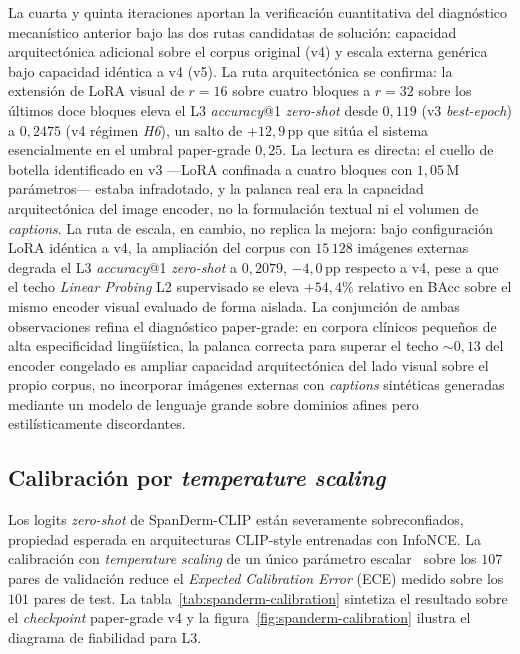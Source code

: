 La cuarta y quinta iteraciones aportan la verificación cuantitativa
del diagnóstico mecanístico anterior bajo las dos rutas
candidatas de solución: capacidad arquitectónica adicional sobre
el corpus original (v4) y escala externa genérica bajo capacidad
idéntica a v4 (v5). La ruta arquitectónica se confirma: la
extensión de LoRA visual de $r=16$ sobre cuatro bloques a $r=32$
sobre los últimos doce bloques eleva el L3 \emph{accuracy}@1
\emph{zero-shot} desde $0{,}119$ (v3 \emph{best-epoch}) a
$0{,}2475$ (v4 régimen \emph{H6}), un salto de $+12{,}9$\,pp que
sitúa el sistema esencialmente en el umbral paper-grade
$0{,}25$. La lectura es directa: el cuello de botella
identificado en v3 ---LoRA confinada a cuatro bloques con
$1{,}05$\,M parámetros--- estaba infradotado, y la palanca real
era la capacidad arquitectónica del image encoder, no la
formulación textual ni el volumen de \emph{captions}. La ruta de
escala, en cambio, no replica la mejora: bajo configuración LoRA
idéntica a v4, la ampliación del corpus con $15\,128$ imágenes
externas degrada el L3 \emph{accuracy}@1 \emph{zero-shot} a
$0{,}2079$, $-4{,}0$\,pp respecto a v4, pese a que el techo
\emph{Linear Probing} L2 supervisado se eleva $+54{,}4\%$ relativo
en BAcc sobre el mismo encoder visual evaluado de forma aislada.
La conjunción de ambas
observaciones refina el diagnóstico paper-grade: en corpora
clínicos pequeños de alta especificidad lingüística, la palanca
correcta para superar el techo $\sim 0{,}13$ del encoder
congelado es ampliar capacidad arquitectónica del lado visual
sobre el propio corpus, no incorporar imágenes externas con
\emph{captions} sintéticas generadas mediante un modelo de
lenguaje grande sobre dominios afines pero estilísticamente
discordantes.

\subsection*{Calibración por \emph{temperature scaling}}

Los logits \emph{zero-shot} de SpanDerm-CLIP están severamente
sobreconfiados, propiedad esperada en arquitecturas CLIP-style
entrenadas con InfoNCE. La calibración con \emph{temperature
scaling} de un único parámetro escalar~\cite{guo2017} sobre los
$107$ pares de validación reduce el \emph{Expected Calibration
Error} (ECE) medido sobre los $101$ pares de test. La
tabla~\ref{tab:spanderm-calibration} sintetiza el resultado sobre
el \emph{checkpoint} paper-grade v4 y la
figura~\ref{fig:spanderm-calibration} ilustra el diagrama de
fiabilidad para L3.

